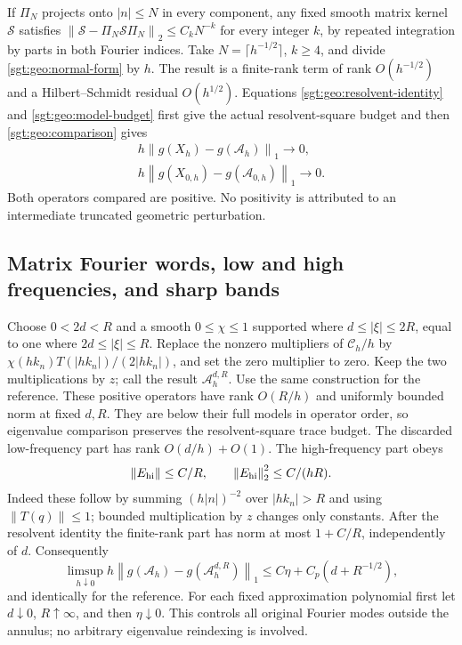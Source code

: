 \documentclass[aps,pra,reprint,superscriptaddress,longbibliography]{revtex4-2}
\newcommand{\norm}[1]{\left\lVert#1\right\rVert}
\begin{document}
If $\Pi_N$ projects onto $|n|\leq N$ in every component, any fixed
smooth matrix kernel $\mathcal S$ satisfies
$\norm{\mathcal S-\Pi_N\mathcal S\Pi_N}_2\leq C_kN^{-k}$ for every
integer $k$, by repeated integration by parts in both Fourier indices.
Take $N=\lceil h^{-1/2}\rceil$, $k\geq4$, and divide
\eqref{sgt:geo:normal-form} by $h$.  The result is a finite-rank term
of rank $O(h^{-1/2})$ and a Hilbert--Schmidt residual $O(h^{1/2})$.
Equations \eqref{sgt:geo:resolvent-identity} and
\eqref{sgt:geo:model-budget} first give the actual resolvent-square
budget and then \eqref{sgt:geo:comparison} gives
\begin{equation}
\begin{gathered}
 h\norm{g(X_h)-g(\mathcal A_h)}_1\longrightarrow0,
 \\
 h\norm{g(X_{0,h})-g(\mathcal A_{0,h})}_1\longrightarrow0.
 \label{sgt:geo:actual-model}
\end{gathered}
\end{equation}
Both operators compared are positive.  No positivity is attributed to
an intermediate truncated geometric perturbation.

\subsection{Matrix Fourier words, low and high frequencies, and sharp bands}
\label{sgt:geo:fourier}

Choose $0<2d<R$ and a smooth $0\leq\chi\leq1$ supported where
$d\leq|\xi|\leq2R$, equal to one where $2d\leq|\xi|\leq R$.
Replace the nonzero multipliers of $\mathcal C_h/h$ by
$\chi(hk_n)T(|hk_n|)/(2|hk_n|)$, and set the zero multiplier to zero.
Keep the two multiplications by $z$; call the result
$\mathcal A_h^{d,R}$.  Use the same construction for the reference.
These positive operators have rank $O(R/h)$ and uniformly bounded
norm at fixed $d,R$.  They are below their full models in operator
order, so eigenvalue comparison preserves the resolvent-square trace
budget.  The discarded low-frequency part has rank $O(d/h)+O(1)$.
The high-frequency part obeys
\begin{equation}
 \norm{E_{\rm hi}}\leq C/R,\qquad
 \norm{E_{\rm hi}}_2^2\leq C/(hR).
 \label{sgt:geo:frequency-tail}
\end{equation}
Indeed these follow by summing $(h|n|)^{-2}$ over $|hk_n|>R$ and
using $\norm{T(q)}\leq1$; bounded multiplication by $z$ changes only
constants.  After the resolvent identity the finite-rank part has
norm at most $1+C/R$, independently of $d$.  Consequently
\begin{equation}
 \limsup_{h\downarrow0}h\norm{g(\mathcal A_h)
                              -g(\mathcal A_h^{d,R})}_1
 \leq C\eta+C_p(d+R^{-1/2}),
 \label{sgt:geo:cutoff-removal}
\end{equation}
and identically for the reference.  For each fixed approximation
polynomial first let $d\downarrow0$, $R\uparrow\infty$, and then
$\eta\downarrow0$.  This controls all original Fourier modes outside
the annulus; no arbitrary eigenvalue reindexing is involved.
\end{document}
